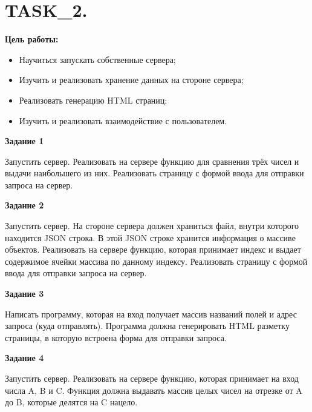 \chapter{TASK\_2.}

\textbf{Цель работы:}

\begin{itemize} 
	\item Научиться запускать собственные сервера;
	\item Изучить и реализовать хранение данных на стороне сервера;
	\item Реализовать генерацию HTML страниц;
	\item Изучить и реализовать взаимодействие с пользователем.
\end{itemize}

\textbf{Задание 1}

Запустить сервер. Реализовать на сервере функцию для сравнения трёх чисел и выдачи наибольшего из них. Реализовать страницу с формой ввода для отправки запроса на сервер.

\textbf{Задание 2}

Запустить сервер. На стороне сервера должен храниться файл, внутри которого находится JSON строка. В этой JSON строке хранится информация о массиве объектов. Реализовать на сервере функцию, которая принимает индекс и выдает содержимое ячейки массива по данному индексу. Реализовать страницу с формой ввода для отправки запроса на сервер.

\textbf{Задание 3}

Написать программу, которая на вход получает массив названий полей и адрес запроса (куда отправлять). Программа должна генерировать HTML разметку страницы, в которую встроена форма для отправки запроса.

\textbf{Задание 4}

Запустить сервер. Реализовать на сервере функцию, которая принимает на вход числа A, B и C. Функция должна выдавать массив целых чисел на отрезке от A до B, которые делятся на C нацело.

